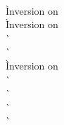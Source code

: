 \begin{description}
\begin{tabbing}
     \\
      \` Inversion on  \\
      \` Inversion on  \\
      \`  \\
      \`  \\
      \` Inversion on  \\
      \`  \\
      \`  \\
      \`  \\
      \`  \\
  \end{tabbing}


\end{description}
